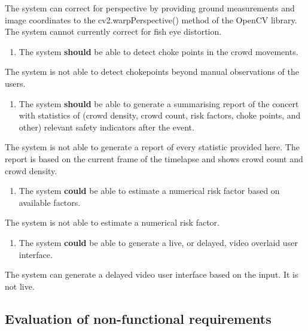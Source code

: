 \documentclass[
]{article}
\providecommand{\tightlist}{%
  \setlength{\itemsep}{0pt}\setlength{\parskip}{0pt}}\usepackage{longtable,booktabs,array}
\begin{document}
The system can correct for perspective by providing ground measurements
and image coordinates to the cv2.warpPerspective() method of the OpenCV
library. The system cannot currently correct for fish eye distortion.

\begin{enumerate}
\def\labelenumi{\arabic{enumi}.}
\setcounter{enumi}{6}
\tightlist
\item
  The system \textbf{should} be able to detect choke points in the crowd
  movements.
\end{enumerate}

The system is not able to detect chokepoints beyond manual observations
of the users.

\begin{enumerate}
\def\labelenumi{\arabic{enumi}.}
\setcounter{enumi}{7}
\tightlist
\item
  The system \textbf{should} be able to generate a summarising report of
  the concert with statistics of (crowd density, crowd count, risk
  factors, choke points, and other) relevant safety indicators after the
  event.
\end{enumerate}

The system is not able to generate a report of every statistic provided
here. The report is based on the current frame of the timelapse and
shows crowd count and crowd density.

\begin{enumerate}
\def\labelenumi{\arabic{enumi}.}
\setcounter{enumi}{8}
\tightlist
\item
  The system \textbf{could} be able to estimate a numerical risk factor
  based on available factors.
\end{enumerate}

The system is not able to estimate a numerical risk factor.

\begin{enumerate}
\def\labelenumi{\arabic{enumi}.}
\setcounter{enumi}{9}
\tightlist
\item
  The system \textbf{could} be able to generate a live, or delayed,
  video overlaid user interface.
\end{enumerate}

The system can generate a delayed video user interface based on the
input. It is not live.

\hypertarget{sec-eval_non_functional_requirements}{%
\subsection{Evaluation of non-functional
requirements}\label{sec-eval_non_functional_requirements}}
\end{document}
